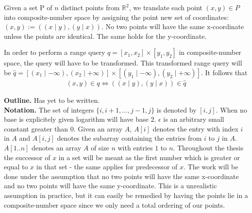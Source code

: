 Given a set P of $n$ distinct points from $\mathbb{R}^2$, we translate each point $(x,y) \in P$ into composite-number space by assigning the point new set of coordinates: $(x,y) := ( (x \mid y), (y \mid x) )$. No two points will have the same x-coordinate unless the points are identical. The same holds for the y-coordinate.

\noindent In order to perform a range query $q = [x_1, x_2] \times [y_1, y_2]$ in composite-number space, the query will have to be transformed. This transformed range query will be $\hat{q} = [(x_1 \mid -\infty), (x_2 \mid +\infty)] \times [(y_1 \mid -\infty), (y_2 \mid +\infty)]$. It follows that 
\begin{align*}
  (x,y) \in q \iff ( (x \mid y), (y \mid x) ) \in \hat{q}
\end{align*}


\noindent \textbf{Outline.} Has yet to be written. \\

\noindent \textbf{Notation.} The set of integers $\{i, i+1, \dots, j-1, j\}$ is denoted by $[i,j]$. When no base is explicitely given logarithm will have base $2$. $\epsilon$ is an arbitrary small constant greater than $0$. Given an array $A$, $A[i]$ denotes the entry with index $i$ in $A$ and $A[i,j]$ denotes the subarray containing the entries from $i$ to $j$ in $A$. $A[1..n]$ denotes an array $A$ of size $n$ with entries $1$ to $n$. Throughout the thesis the successor of $x$ in a set will be meant as the first number which is greater or equal to $x$ in that set - the same applies for predecessor of $x$. The work will be done under the assumption that no two points will  have the same x-coordinate and no two points will have the same y-coordinate. This is a unrealistic assumption in practice, but it can easily be remedied by having the points lie in a composite-number space since we only need a total ordering of our points.




